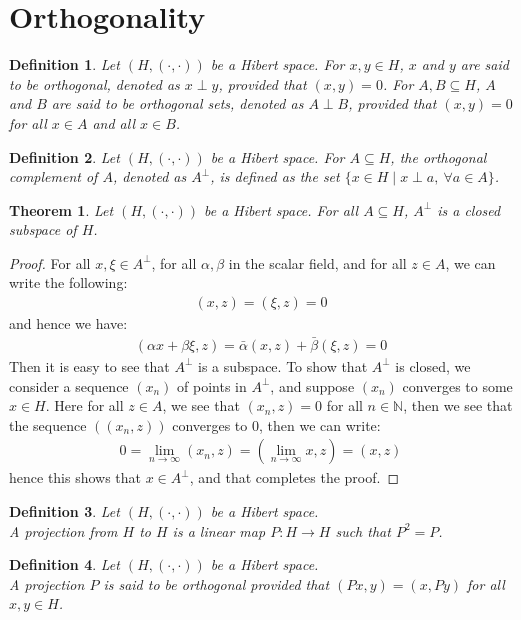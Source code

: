 \documentclass[11pt]{book}
\theoremstyle{break}
\theoremstyle{break}
\newtheorem{thm}{Theorem}[section]
\newtheorem{defn}{Definition}[corL]
\newcommand{\N}{\mathbb{N}}
\begin{document}
\newpage
\section[Orthogonality]{\color{red} Orthogonality \color{black}}
\begin{defn}
Let $(H, (\cdot , \cdot) )$ be a Hibert space. For $x,y \in H$, $x$ and $y$ are said to be orthogonal, denoted as $x \perp y$, provided that $(x,y) = 0$. For $A,B \subseteq H$, $A$ and $B$ are said to be orthogonal sets, denoted as $A\perp B$, provided that $(x,y) = 0$ for all $x \in A$ and all $x \in B$. 
\end{defn}
\begin{defn}
Let $(H, (\cdot , \cdot) )$ be a Hibert space. For $A \subseteq H$, the orthogonal complement of $A$, denoted as $A^{\perp}$, is defined as the set $\{x\in H\mid x\perp a, \ \forall a \in A\}$. 
\end{defn}

\begin{thm}
Let $(H, (\cdot , \cdot) )$ be a Hibert space. For all $A \subseteq H$, $A^{\perp}$ is a closed subspace of $H$.
\end{thm}
\begin{proof}
For all $x,\xi \in A^{\perp}$, for all $\alpha,\beta$ in the scalar field, and for all $z \in A$, we can write the following:
\begin{align*}
(x,z) = (\xi, z) = 0
\end{align*}
and hence we have:
\begin{align*}
(\alpha x + \beta \xi, z) = \bar{ \alpha}(x,z) + \bar{\beta}(\xi,z ) = 0
\end{align*}
Then it is easy to see that $A^{\perp}$ is a subspace. To show that $A^{\perp}$ is closed, we consider a sequence $(x_n)$ of points in $A^{\perp}$, and suppose $(x_n)$ converges to some $x \in H$. Here for all $z \in A$, we see that $(x_n, z) = 0$ for all $n \in \N$, then we see that the sequence $((x_n,z))$ converges to $0$, then we can write:
\begin{align*}
0 =\lim_{n\to \infty}(x_n,z) = \left(\lim_{n\to \infty} x,z \right) = (x,z)
\end{align*}
hence this shows that $x \in A^{\perp}$, and that completes the proof. 
\end{proof}


\begin{defn}
Let $(H, (\cdot , \cdot ))$ be a Hibert space.\\ A projection from $H$ to $H$ is a linear map $P:H \to H$ such that $P^2 = P$. 
\end{defn}
\begin{defn}
Let $(H, (\cdot , \cdot ))$ be a Hibert space.\\ A projection $P$ is said to be orthogonal provided that $(Px,y)=(x,Py)$ for all $x,y \in H$. 
\end{defn}
\end{document}

